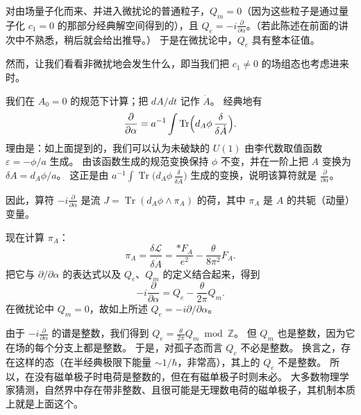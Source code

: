 对由场量子化而来、并进入微扰论的普通粒子，$Q_m=0$（因为这些粒子是通过量子化 $c_1=0$ 的那部分经典解空间得到的），且 $Q_e=-i\frac{\partial}{\partial\alpha}$。（若此陈述在前面的讲次中不熟悉，稍后就会给出推导。）
于是在微扰论中，$Q_e$ 具有整本征值。

然而，让我们看看非微扰地会发生什么，即当我们把 $c_1\neq0$ 的场组态也考虑进来时。

我们在 $A_0=0$ 的规范下计算；把 $dA/dt$ 记作 $\dot A$。
经典地有
\[
\frac{\partial}{\partial\alpha}
=a^{-1}\int\operatorname{Tr}\Bigl(d_A\phi\,\frac{\delta}{\delta\dot A}\Bigr).
\]
理由是：如上面提到的，我们可以认为未破缺的 $U(1)$ 由李代数取值函数 $\varepsilon=-\phi/a$ 生成。
由该函数生成的规范变换保持 $\phi$ 不变，并在一阶上把 $A$ 变换为 $\delta A=d_A\phi/a$。
这正是由 $a^{-1}\int\operatorname{Tr}\bigl(d_A\phi\,\frac{\delta}{\delta\dot A}\bigr)$ 生成的变换，说明该算符就是 $\frac{\partial}{\partial\alpha}$。

因此，算符 $-i\frac{\partial}{\partial\alpha}$ 是流 $J=\operatorname{Tr}(d_A\phi\wedge\pi_A)$ 的荷，其中 $\pi_A$ 是 $A$ 的共轭（动量）变量。

现在计算 $\pi_A$：
\begin{equation}
  \tag{9.10}
  \label{eq:9-10}
  \pi_A=\frac{\delta\mathcal{L}}{\delta\dot A}
  =\frac{\ast F_A}{e^2}-\frac{\theta}{8\pi^2}F_A.
\end{equation}
把它与 $\partial/\partial\alpha$ 的表达式以及 $Q_e$、$Q_m$ 的定义结合起来，得到
\begin{equation}
  \tag{9.11}
  \label{eq:9-11}
  -i\frac{\partial}{\partial\alpha}=Q_e-\frac{\theta}{2\pi}Q_m.
\end{equation}
在微扰论中 $Q_m=0$，故如上所述 $Q_e=-i\partial/\partial\alpha$。

由于 $-i\frac{\partial}{\partial\alpha}$ 的谱是整数，我们得到 $Q_e=\frac{\theta}{2\pi}Q_m\bmod\mathbb{Z}$。
但 $Q_m$ 也是整数，因为它在场的每个分支上都是整数。
于是，对孤子态而言 $Q_e$ 不必是整数。
换言之，存在这样的态（在半经典极限下能量 $\sim1/\hbar$，非常高），其上的 $Q_e$ 不是整数。
所以，在没有磁单极子时电荷是整数的，但在有磁单极子时则未必。
大多数物理学家猜测，自然界中存在带非整数、且很可能是无理数电荷的磁单极子，其机制本质上就是上面这个。


